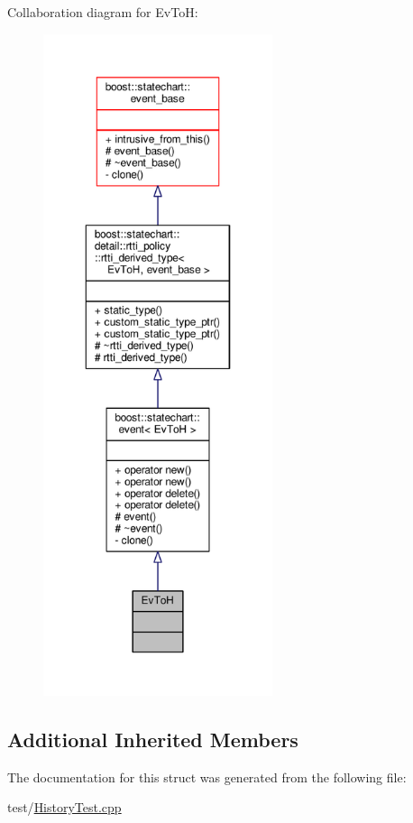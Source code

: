 Collaboration diagram for Ev\+ToH\+:
\nopagebreak
\begin{figure}[H]
\begin{center}
\leavevmode
\includegraphics[height=550pt]{struct_ev_to_h__coll__graph}
\end{center}
\end{figure}
\subsection*{Additional Inherited Members}


The documentation for this struct was generated from the following file\+:\begin{DoxyCompactItemize}
\item 
test/\mbox{\hyperlink{_history_test_8cpp}{History\+Test.\+cpp}}\end{DoxyCompactItemize}
